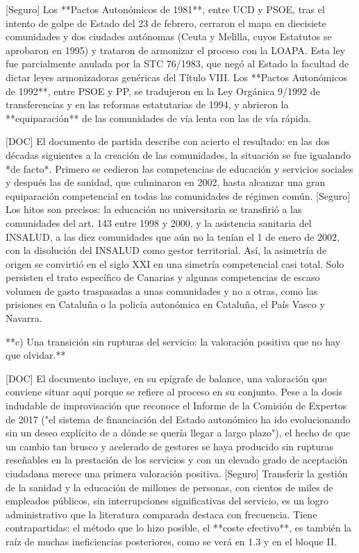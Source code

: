 \documentclass[10pt,a4paper]{article}
\begin{document}
[Seguro] Los **Pactos Autonómicos de 1981**, entre UCD y PSOE, tras el intento de golpe de Estado del 23 de febrero, cerraron el mapa en diecisiete comunidades y dos ciudades autónomas (Ceuta y Melilla, cuyos Estatutos se aprobaron en 1995) y trataron de armonizar el proceso con la LOAPA. Esta ley fue parcialmente anulada por la STC 76/1983, que negó al Estado la facultad de dictar leyes armonizadoras genéricas del Título VIII. Los **Pactos Autonómicos de 1992**, entre PSOE y PP, se tradujeron en la Ley Orgánica 9/1992 de transferencias y en las reformas estatutarias de 1994, y abrieron la **equiparación** de las comunidades de vía lenta con las de vía rápida.

[DOC] El documento de partida describe con acierto el resultado: en las dos décadas siguientes a la creación de las comunidades, la situación se fue igualando *de facto*. Primero se cedieron las competencias de educación y servicios sociales y después las de sanidad, que culminaron en 2002, hasta alcanzar una gran equiparación competencial en todas las comunidades de régimen común. [Seguro] Los hitos son precisos: la educación no universitaria se transfirió a las comunidades del art. 143 entre 1998 y 2000, y la asistencia sanitaria del INSALUD, a las diez comunidades que aún no la tenían el 1 de enero de 2002, con la disolución del INSALUD como gestor territorial. Así, la asimetría de origen se convirtió en el siglo XXI en una simetría competencial casi total. Solo persisten el trato específico de Canarias y algunas competencias de escaso volumen de gasto traspasadas a unas comunidades y no a otras, como las prisiones en Cataluña o la policía autonómica en Cataluña, el País Vasco y Navarra.

**c) Una transición sin rupturas del servicio: la valoración positiva que no hay que olvidar.**

[DOC] El documento incluye, en su epígrafe de balance, una valoración que conviene situar aquí porque se refiere al proceso en su conjunto. Pese a la dosis indudable de improvisación que reconoce el Informe de la Comisión de Expertos de 2017 ("el sistema de financiación del Estado autonómico ha ido evolucionando sin un deseo explícito de a dónde se quería llegar a largo plazo"), el hecho de que un cambio tan brusco y acelerado de gestores se haya producido sin rupturas reseñables en la prestación de los servicios y con un elevado grado de aceptación ciudadana merece una primera valoración positiva. [Seguro] Transferir la gestión de la sanidad y la educación de millones de personas, con cientos de miles de empleados públicos, sin interrupciones significativas del servicio, es un logro administrativo que la literatura comparada destaca con frecuencia. Tiene contrapartidas: el método que lo hizo posible, el **coste efectivo**, es también la raíz de muchas ineficiencias posteriores, como se verá en 1.3 y en el bloque II.
\end{document}
